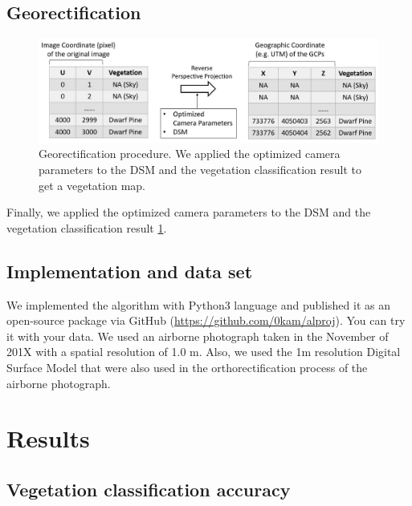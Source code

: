 \documentclass{article}
\begin{document}
\hypertarget{georectification}{%
\subsection{Georectification}\label{georectification}}



\begin{figure}
\includegraphics[width=1\linewidth]{paper_files/figures/Slide6} \caption{Georectification procedure. We applied the optimized camera parameters to the DSM and the vegetation classification result to get a vegetation map.}\label{fig:georec}
\end{figure}

Finally, we applied the optimized camera parameters to the DSM and the vegetation classification result \ref{fig:georec}.

\hypertarget{implementation-and-data-set}{%
\subsection{Implementation and data set}\label{implementation-and-data-set}}

We implemented the algorithm with Python3 language and published it as an open-source package via GitHub (\url{https://github.com/0kam/alproj}). You can try it with your data. We used an airborne photograph taken in the November of 201X with a spatial resolution of 1.0 m. Also, we used the 1m resolution Digital Surface Model that were also used in the orthorectification process of the airborne photograph.

\hypertarget{results}{%
\section{Results}\label{results}}

\hypertarget{vegetation-classification-accuracy}{%
\subsection{Vegetation classification accuracy}\label{vegetation-classification-accuracy}}
\end{document}
